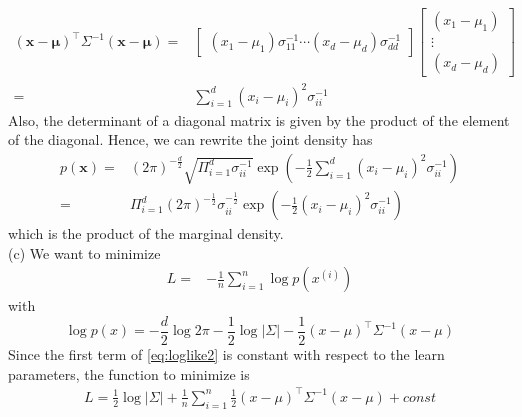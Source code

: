 \documentclass[12pt,english]{amsart}
\theoremstyle{definition}
\begin{document}
\begin{equation}
	\begin{split}
		(\bm{x}-\bm{\mu})^\top \Sigma^{-1}(\bm{x}-\bm{\mu})=&
		\begin{bmatrix}
        			(x_1-\mu_1)\sigma_{11}^{-1} 
        			\cdots 
        			 (x_d-\mu_d)\sigma_{dd}^{-1}
    		\end{bmatrix}
		\begin{bmatrix}
        			(x_1-\mu_1) \\
        			\vdots \\
        			 (x_d-\mu_d)
    		\end{bmatrix}\\
		=& \sum_{i=1}^d (x_i-\mu_i)^2 \sigma_{ii}^{-1}
	\end{split}
\end{equation}
Also, the determinant of a diagonal matrix is given by the product of the element of the diagonal. Hence, we can rewrite the joint density has
\begin{equation}
	\begin{split}
		p(\bm{x}) =& (2\pi)^{-\frac{d}{2}}\sqrt{\Pi_{i=1}^d \sigma_{ii}^{-1}}
		\exp\left(
        			-\frac{1}{2}
			\sum_{i=1}^d (x_i-\mu_i)^2 \sigma_{ii}^{-1}
    		\right)\\
		=&\Pi_{i=1}^d (2\pi)^{-\frac{1}{2}} \sigma_{ii}^{-\frac{1}{2}}
		\exp\left(
        			-\frac{1}{2}
			(x_i-\mu_i)^2 \sigma_{ii}^{-1}
    		\right)
	\end{split}
\end{equation}
which is the product of the marginal density.\\
(c) We want to minimize 
\begin{equation}
\begin{split}
    L =& - \frac{1}{n}\sum_{i=1}^n \log p(x^{(i)})
\end{split}
\end{equation}
with
\begin{equation}
    \log p(x) = -\frac{d}{2}\log 2\pi - \frac{1}{2}\log|\Sigma| - \frac{1}{2}(x-\mu)^\top\Sigma^{-1}(x-\mu)
    \label{eq:loglike2}
\end{equation}
Since the first term of \ref{eq:loglike2} is constant with respect to the learn parameters, the function to minimize is
\begin{equation}
\begin{split}
    L = \frac{1}{2}\log|\Sigma| + \frac{1}{n}\sum_{i=1}^n\frac{1}{2}(x-\mu)^\top\Sigma^{-1}(x-\mu) + const
\end{split}
\label{eq:loglike3}
\end{equation}
\end{document}
